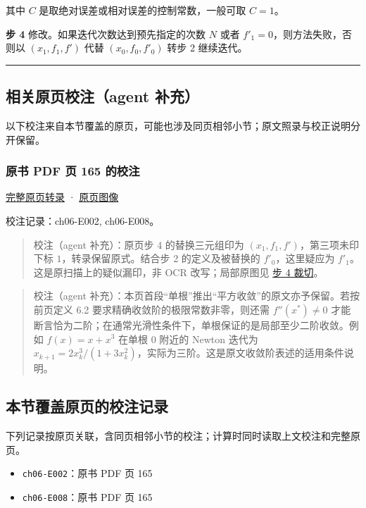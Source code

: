 \documentclass[
  10pt,
  fontset=fandol]{ctexart}
\providecommand{\tightlist}{%
  \setlength{\itemsep}{0pt}\setlength{\parskip}{0pt}}
\begin{document}
其中 \(C\) 是取绝对误差或相对误差的控制常数，一般可取 \(C=1\)。

\textbf{步 4} 修改。如果迭代次数达到预先指定的次数 \(N\) 或者 \(f'_1=0\)，则方法失败，否则以 \((x_1,f_1,f')\) 代替 \((x_0,f_0,f'_0)\) 转步 2 继续迭代。

\begin{center}\rule{0.5\linewidth}{0.5pt}\end{center}

\subsection{相关原页校注（agent 补充）}\label{ux76f8ux5173ux539fux9875ux6821ux6ce8agent-ux8865ux5145}

以下校注来自本节覆盖的原页，可能也涉及同页相邻小节；原文照录与校正说明分开保留。

\subsubsection{原书 PDF 页 165 的校注}\label{ux539fux4e66-pdf-ux9875-165-ux7684ux6821ux6ce8}

\href{../pages/pdf-165.md}{完整原页转录} · \href{../../source-images/pdf-165.jpeg}{原页图像}

校注记录：ch06-E002, ch06-E008。

\begin{quote}
校注（agent 补充）：原页步 4 的替换三元组印为 \((x_1,f_1,f')\)，第三项未印下标 \(1\)，转录保留原式。结合步 2 的定义及被替换的 \(f'_0\)，这里疑应为 \(f'_1\)。这是原扫描上的疑似漏印，非 OCR 改写；局部原图见 \href{../assets/ch06/detail-p165-step4.png}{步 4 裁切}。
\end{quote}

\begin{quote}
校注（agent 补充）：本页首段``单根''推出``平方收敛''的原文亦予保留。若按前页定义 6.2 要求精确收敛阶的极限常数非零，则还需 \(f''(x^*)\ne0\) 才能断言恰为二阶；在通常光滑性条件下，单根保证的是局部至少二阶收敛。例如 \(f(x)=x+x^3\) 在单根 \(0\) 附近的 Newton 迭代为 \(x_{k+1}=2x_k^3/(1+3x_k^2)\)，实际为三阶。这是原文收敛阶表述的适用条件说明。
\end{quote}

\subsection{本节覆盖原页的校注记录}\label{ux672cux8282ux8986ux76d6ux539fux9875ux7684ux6821ux6ce8ux8bb0ux5f55}

下列记录按原页关联，含同页相邻小节的校注；计算时同时读取上文校注和完整原页。

\begin{itemize}
\tightlist
\item
  \texttt{ch06-E002}：原书 PDF 页 165
\item
  \texttt{ch06-E008}：原书 PDF 页 165
\end{itemize}
\end{document}
